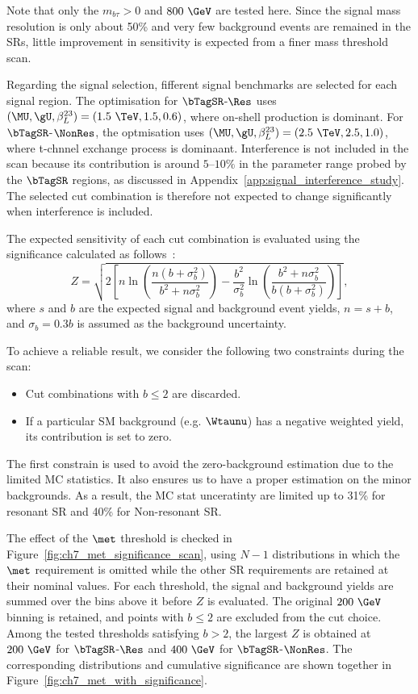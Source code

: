 Note that only the $m_{b\tau}>0$ and $800~\GeV$ are tested here. Since the signal mass resolution is only about 50\% and very few background events are remained in the SRs, little improvement in sensitivity is expected from a finer mass threshold scan.

Regarding the signal selection, fifferent signal benchmarks are selected for each signal region. The optimisation for $\bTagSR$-$\Res$ uses $(\MU,\gU,\beta_L^{23})=(1.5~\TeV,1.5,0.6)$, where on-shell production is dominant.
For $\bTagSR$-$\NonRes$, the optmisation uses $(\MU,\gU,\beta_L^{23})=(2.5~\TeV,2.5,1.0)$, where t-chnnel exchange process is dominaant.
Interference is not included in the scan because its contribution is around $5$--$10\%$ in the parameter range probed by the $\bTagSR$ regions, as discussed in Appendix~\ref{app:signal_interference_study}. The selected cut combination is therefore not expected to change significantly when interference is included.

The expected sensitivity of each cut combination is evaluated using the significance calculated as follows~\cite{ATL-PHYS-PUB-2020-025}:
\begin{equation}
    Z = \sqrt{2\left[n\ln\!\left(\frac{n(b+\sigma_b^2)}{b^2+n\sigma_b^2}\right)-\frac{b^2}{\sigma_b^2}\ln\!\left(\frac{b^2+n\sigma_b^2}{b(b+\sigma_b^2)}\right)\right]},
    \label{eq:ch7_optimisation_significance}
\end{equation}
where $s$ and $b$ are the expected signal and background event yields, $n=s+b$, and $\sigma_b=0.3b$ is assumed as the background uncertainty.

To achieve a reliable result, we consider the following two constraints during the scan:
\begin{itemize}
    \item Cut combinations with $b\leq2$ are discarded.
    \item If a particular SM background (e.g. $\Wtaunu$) has a negative weighted yield, its contribution is set to zero.
\end{itemize}
The first constrain is used to avoid the zero-background estimation due to the limited MC statistics. It also ensures us to have a proper estimation on the minor backgrounds. As a result, the MC stat unceratinty are limited up to 31\% for resonant SR and 40\% for Non-resonant SR.

The effect of the $\met$ threshold is checked in Figure~\ref{fig:ch7_met_significance_scan}, using $N-1$ distributions in which the $\met$ requirement is omitted while the other SR requirements are retained at their nominal values.
For each threshold, the signal and background yields are summed over the bins above it before $Z$ is evaluated.
The original $200~\GeV$ binning is retained, and points with $b\leq2$ are excluded from the cut choice.
Among the tested thresholds satisfying $b>2$, the largest $Z$ is obtained at $200~\GeV$ for $\bTagSR$-$\Res$ and $400~\GeV$ for $\bTagSR$-$\NonRes$.
The corresponding distributions and cumulative significance are shown together in Figure~\ref{fig:ch7_met_with_significance}.

